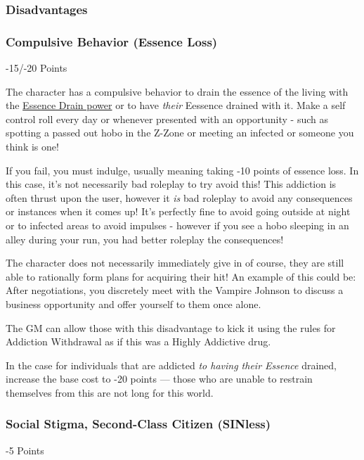 \begin{multicols}{3}
	\subsubsection{Disadvantages}
	
	\subsubsection*{Compulsive Behavior (Essence Loss)}
	\begin{flushright}
		-15/-20 Points
	\end{flushright}
	
	The character has a compulsive behavior to drain the essence of the living with the \hyperref[essence_drain]{Essence Drain power} or to have \textit{their} Eessence drained with it. Make a self control roll every day or whenever presented with an opportunity - such as spotting a passed out hobo in the Z-Zone or meeting an infected or someone you think is one!
	
	If you fail, you must indulge, usually meaning taking -10 points of essence loss. In this case, it's not necessarily bad roleplay to try avoid this! This addiction is often thrust upon the user, however it \textit{is} bad roleplay to avoid any consequences or instances when it comes up! It's perfectly fine to avoid going outside at night or to infected areas to avoid impulses - however if you see a hobo sleeping in an alley during your run, you had better roleplay the consequences!
	
	The character does not necessarily immediately give in of course, they are still able to rationally form plans for acquiring their hit! An example of this could be: After negotiations, you discretely meet with the Vampire Johnson to discuss a business opportunity and offer yourself to them once alone.
	
	The GM can allow those with this disadvantage to kick it using the rules for Addiction Withdrawal as if this was a Highly Addictive drug.
	
	In the case for individuals that are addicted \textit{to having their Essence} drained, increase the base cost to -20 points — those who are unable to restrain themselves from this are not long for this world.
	
	\subsubsection*{Social Stigma, Second-Class Citizen (SINless)}
	\begin{flushright}
		-5 Points
	\end{flushright}
	

\end{multicols}
